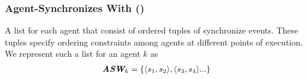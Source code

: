         \subsubsection{Agent-Synchronizes With ()}
        A list for each agent that consist of ordered tuples of synchronize events. These tuples specify ordering constraints among agents at different points of execution. We represent such a list for an agent $k$ as 
            \begin{align*}
                \textit{\textbf{\textit{ASW}}}_k = \{ \langle s_1, s_2 \rangle, \langle s_3, s_4 \rangle ...\}    
            \end{align*}